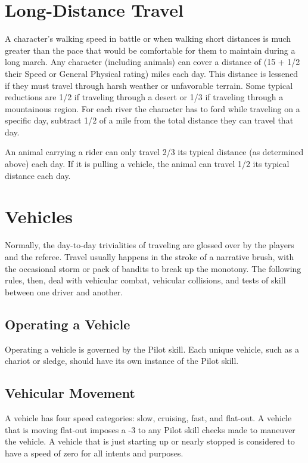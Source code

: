 \documentclass[oneside]{book}
\begin{document}
\begin{multicols}{2}
\section{Long-Distance Travel}
A character's walking speed in battle or when walking short distances is much greater than the pace that would be comfortable for them to maintain during a long march. Any character (including animals) can cover a distance of (15 + 1/2 their Speed or General Physical rating) miles each day. This distance is lessened if they must travel through harsh weather or unfavorable terrain. Some typical reductions are 1/2 if traveling through a desert or 1/3 if traveling through a mountainous region. For each river the character has to ford while traveling on a specific day, subtract 1/2 of a mile from the total distance they can travel that day.  

An animal carrying a rider can only travel 2/3 its typical distance (as determined above) each day. If it is pulling a vehicle, the animal can travel 1/2 its typical distance each day. 

\section{Vehicles}
Normally, the day-to-day trivialities of traveling are glossed over by the players and the referee. Travel usually happens in the stroke of a narrative brush, with the occasional storm or pack of bandits to break up the monotony. The following rules, then, deal with vehicular combat, vehicular collisions, and tests of skill between one driver and another.

\subsection{Operating a Vehicle}
Operating a vehicle is governed by the Pilot skill. Each unique vehicle, such as a chariot or sledge, should have its own instance of the Pilot skill. 

\subsection{Vehicular Movement}
A vehicle has four speed categories: slow, cruising, fast, and flat-out. A vehicle that is moving flat-out imposes a -3 to any Pilot skill checks made to maneuver the vehicle. A vehicle that is just starting up or nearly stopped is considered to have a speed of zero for all intents and purposes. 


\end{multicols}
\end{document}

